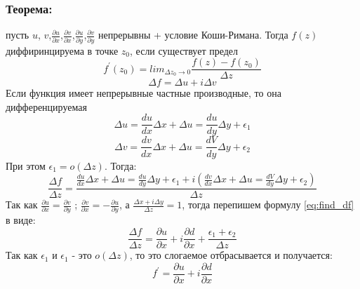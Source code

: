 \documentclass{article}
\begin{document}
            \subsubsection*{Теорема:}
            пусть $u$, $v$,$\frac{\partial u}{\partial x}$,$\frac{\partial v}{\partial x}$,$\frac{\partial u}{\partial y}$,$\frac{\partial v}{\partial y}$ непрерывны + условие Коши-Римана. Тогда $f(z)$ диффиринцируема в точке $z_{0}$, если существует предел 
            \begin{equation}
              f^{\prime}(z_{0})=lim_{\Delta z_{0} \rightarrow 0} \frac{f(z)-f(z_{0})}{\Delta z}
            \end{equation}
            \bigskip
            \begin{equation}
              \Delta f= \Delta u + i \Delta v
            \end{equation}
            Если функция имеет непрерывные частные производные, то она дифференцируемая
            \begin{equation}
              \Delta u=\frac{d u}{d x} \Delta x + \Delta u=\frac{d u}{d y} \Delta y + \epsilon_{1}
            \end{equation}
            \begin{equation}
              \Delta v=\frac{d v}{d x} \Delta x + \Delta u=\frac{d V}{d y} \Delta y + \epsilon_{2}
            \end{equation}
            При этом $\epsilon_{1}=o(\Delta z)$. Тогда:
            \begin{equation}\label{eq:find_df}
              \frac{\Delta f}{\Delta z}=\frac{\frac{d u}{d x} \Delta x + \Delta u=\frac{d u}{d y} \Delta y + \epsilon_{1} + i (\frac{d v}{d x} \Delta x + \Delta u=\frac{d V}{d y} \Delta y + \epsilon_{2})}{\Delta z}
            \end{equation}
            Так как $\frac{\partial u}{\partial x} = \frac{\partial v}{\partial y}$ ; $\frac{\partial v}{\partial x} = - \frac{\partial u}{\partial y}$, а $\frac{\Delta x+i \Delta y}{\Delta z}=1$, тогда перепишем формулу \ref{eq:find_df}  в виде:
            \begin{equation}
              \frac{\Delta f}{\Delta z}=\frac{\partial u}{\partial x} + i \frac{\partial d}{\partial x}+ \frac{\epsilon_{1}+\epsilon_{2}}{\Delta z}
            \end{equation}
            Так как $\epsilon_{1}$ и $\epsilon_{1}$ - это $o(\Delta z)$, то это слогаемое отбрасывается и получается:
              \begin{equation}
                f^{\prime}=\frac{\partial u}{\partial x} + i \frac{\partial d}{\partial x}
              \end{equation}
\end{document}
